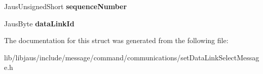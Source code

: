 \begin{DoxyCompactItemize}
\item 
\hypertarget{struct_set_data_link_select_message_struct_ab351b56ddda5b9504af6e3f3be272fb8}{\-Jaus\-Unsigned\-Short {\bfseries sequence\-Number}}\label{struct_set_data_link_select_message_struct_ab351b56ddda5b9504af6e3f3be272fb8}

\item 
\hypertarget{struct_set_data_link_select_message_struct_a5c1460b0c1067f595138c649e2d905fd}{\-Jaus\-Byte {\bfseries data\-Link\-Id}}\label{struct_set_data_link_select_message_struct_a5c1460b0c1067f595138c649e2d905fd}

\end{DoxyCompactItemize}


\-The documentation for this struct was generated from the following file\-:\begin{DoxyCompactItemize}
\item 
lib/libjaus/include/message/command/communications/set\-Data\-Link\-Select\-Message.\-h\end{DoxyCompactItemize}
